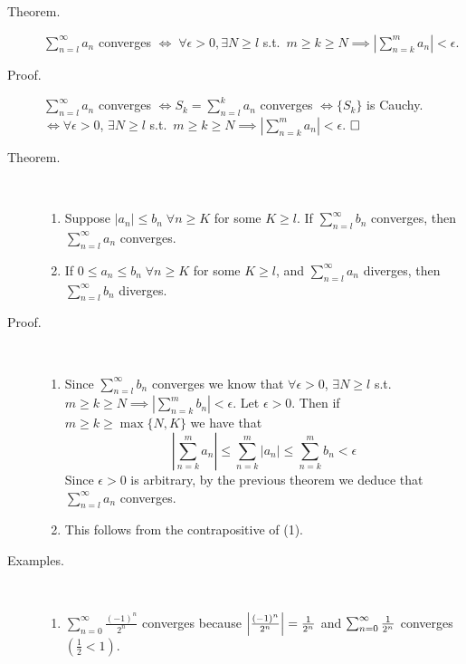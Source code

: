 \documentclass[letterpaper,11pt]{article}
\begin{document}
\begin{description}
\item[Theorem.] $\sum_{n=l}^\infty a_n$ converges $\iff\;\forall\epsilon>0,
    \exists N\ge l$ s.t.\ $m\ge k\ge N\implies
    \left|\sum_{n=k}^m a_n\right|<\epsilon$.

\item[Proof.] $\sum_{n=l}^\infty a_n$ converges $\iff S_k=\sum_{n=l}^k a_n$
    converges $\iff \{S_k\}$ is Cauchy. $\iff \forall\epsilon>0$,
    $\exists N\ge l$ s.t.\ $m\ge k\ge N\implies
    \left|\sum_{n=k}^m a_n\right|<\epsilon$. $\hfill\square$


\item[Theorem.] \text{}\vspace{-0.2in}\\
  \begin{enumerate}[1)]
  \item Suppose $|a_n|\le b_n\;\forall n\ge K$ for some $K\ge l$.
       If $\sum_{n=l}^\infty b_n$ converges, then
       $\sum_{n=l}^\infty a_n$ converges.
  \item If $0\le a_n\le b_n\;\forall n\ge K$ for some $K\ge l$, and
      $\sum_{n=l}^\infty a_n$ diverges, then $\sum_{n=l}^\infty b_n$ diverges.
  \end{enumerate}

\item[Proof.] \text{}\vspace{-0.2in}\\
  \begin{enumerate}[1)]
  \item Since $\sum_{n=l}^\infty b_n$ converges we know that
      $\forall \epsilon>0$, $\exists N\ge l$ s.t.\ $m\ge k\ge N\implies
      |\sum_{n=k}^m b_n|<\epsilon$. Let $\epsilon>0$. Then if
      $m\ge k\ge \max\{N,K\}$ we have that
      \[
      \left|\sum_{n=k}^m a_n\right|\le \sum_{n=k}^m|a_n|\le
      \sum_{n=k}^m b_n<\epsilon
      \]
      Since $\epsilon>0$ is arbitrary, by the previous theorem
      we deduce that $\sum_{n=l}^\infty a_n$ converges.

  \item This follows from the contrapositive of (1).
  \end{enumerate}


\item[Examples.]\text{}\vspace{-0.2in}\\
  \begin{enumerate}[1)]
  \item $\sum_{n=0}^\infty \frac{(-1)^n}{2^n}$ converges because
      $\left|\frac{(-1)^n}{2^n}\right|=\frac{1}{2^n}$ and
      $\sum_{n=0}^\infty\frac{1}{2^n}$ converges $(\frac{1}{2}<1)$.


\end{enumerate}
\end{description}
\end{document}

